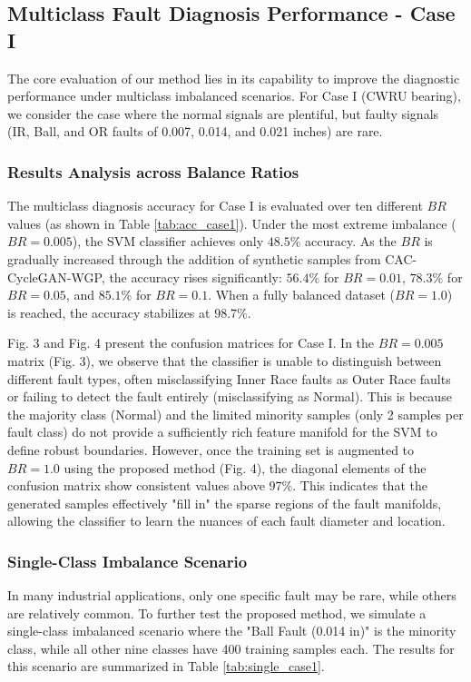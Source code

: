 \subsection{Multiclass Fault Diagnosis Performance - Case I}
The core evaluation of our method lies in its capability to improve the diagnostic performance under multiclass imbalanced scenarios. For Case I (CWRU bearing), we consider the case where the normal signals are plentiful, but faulty signals (IR, Ball, and OR faults of 0.007, 0.014, and 0.021 inches) are rare.

\subsubsection{Results Analysis across Balance Ratios}
The multiclass diagnosis accuracy for Case I is evaluated over ten different $BR$ values (as shown in Table \ref{tab:acc_case1}). Under the most extreme imbalance ($BR = 0.005$), the SVM classifier achieves only $48.5\%$ accuracy. As the $BR$ is gradually increased through the addition of synthetic samples from CAC-CycleGAN-WGP, the accuracy rises significantly: $56.4\%$ for $BR=0.01$, $78.3\%$ for $BR=0.05$, and $85.1\%$ for $BR=0.1$. When a fully balanced dataset ($BR=1.0$) is reached, the accuracy stabilizes at $98.7\%$.

Fig. 3 and Fig. 4 present the confusion matrices for Case I. In the $BR=0.005$ matrix (Fig. 3), we observe that the classifier is unable to distinguish between different fault types, often misclassifying Inner Race faults as Outer Race faults or failing to detect the fault entirely (misclassifying as Normal). This is because the majority class (Normal) and the limited minority samples (only 2 samples per fault class) do not provide a sufficiently rich feature manifold for the SVM to define robust boundaries. However, once the training set is augmented to $BR=1.0$ using the proposed method (Fig. 4), the diagonal elements of the confusion matrix show consistent values above $97\%$. This indicates that the generated samples effectively "fill in" the sparse regions of the fault manifolds, allowing the classifier to learn the nuances of each fault diameter and location.

\subsubsection{Single-Class Imbalance Scenario}
In many industrial applications, only one specific fault may be rare, while others are relatively common. To further test the proposed method, we simulate a single-class imbalanced scenario where the "Ball Fault (0.014 in)" is the minority class, while all other nine classes have 400 training samples each. The results for this scenario are summarized in Table \ref{tab:single_case1}.

